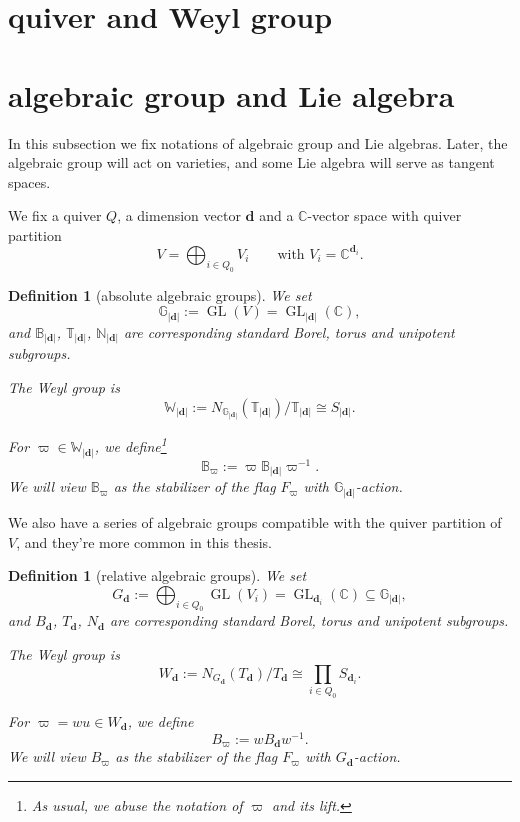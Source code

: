 \documentclass[reqno,11pt]{book}
\numberwithin{equation}{section}
\theoremstyle{plain}
\newtheorem{defn}[theorem]{Definition}
\theoremstyle{plain}
\numberwithin{equation}{section}
\theoremstyle{remark}
\DeclareMathOperator{\GL}{\operatorname{GL}}
\newcommand{\dimvec}[1]{\mathbf{#1}}
\newcommand{\abdimvec}[1]{|\dimvec{#1}|}
\newcommand{\absgp}[1]{\mathbb{#1}}
\newcommand{\ww}{\varpi}
\begin{document}
\section{quiver and Weyl group}
\section{algebraic group and Lie algebra}

In this subsection we fix notations of algebraic group and Lie algebras. Later, the algebraic group will act on varieties, and some Lie algebra will serve as tangent spaces.

We fix a quiver $Q$, a dimension vector $\dimvec{d}$ and a $\mathbb{C}$-vector space with quiver partition
$$V=\bigoplus_{i \in Q_0} V_i \qquad \text{with } V_i=\mathbb{C}^{\dimvec{d}_i}.$$

\begin{defn}[absolute algebraic groups]
We set
$$\absgp{G}_{\abdimvec{d}}:= \GL(V)=\GL_{\abdimvec{d}}(\mathbb{C}),$$
and $\absgp{B}_{\abdimvec{d}}$, $\absgp{T}_{\abdimvec{d}}$, $\absgp{N}_{\abdimvec{d}}$ are corresponding standard Borel, torus and unipotent subgroups.

The Weyl group is
$$\absgp{W}_{\abdimvec{d}}:= N_{\absgp{G}_{\abdimvec{d}}}(\absgp{T}_{\abdimvec{d}})/\absgp{T}_{\abdimvec{d}} \cong S_{\abdimvec{d}}.$$

For $\ww \in \absgp{W}_{\abdimvec{d}}$, we define\footnote{As usual, we abuse the notation of $\ww$ and its lift.}
$$\absgp{B}_{\ww}:= \ww \absgp{B}_{\abdimvec{d}} \ww^{-1}.$$
We will view $\absgp{B}_{\ww}$ as the stabilizer of the flag $F_{\ww}$ with $\absgp{G}_{\abdimvec{d}}$-action.
\end{defn}

We also have a series of algebraic groups compatible with the quiver partition of $V$, and they're more common in this thesis.

\begin{defn}[relative algebraic groups]

We set
$$G_{\dimvec{d}}:= \bigoplus_{i \in Q_0}\GL(V_i)=\GL_{\dimvec{d}_i}(\mathbb{C}) \subseteq \absgp{G}_{\abdimvec{d}},$$
and $B_{\dimvec{d}}$, $T_{\dimvec{d}}$, $N_{\dimvec{d}}$ are corresponding standard Borel, torus and unipotent subgroups.

The Weyl group is
$$W_{\dimvec{d}}:= N_{G_{\dimvec{d}}}(T_{\dimvec{d}})/T_{\dimvec{d}} \cong \prod_{i \in Q_0}S_{\dimvec{d}_i}.$$

For $\ww=wu \in W_{\dimvec{d}}$, we define
$$B_{\ww}:= w B_{\dimvec{d}} w^{-1}.$$
We will view $B_{\ww}$ as the stabilizer of the flag $F_{\ww}$ with $G_{\dimvec{d}}$-action.
\end{defn}
\end{document}
